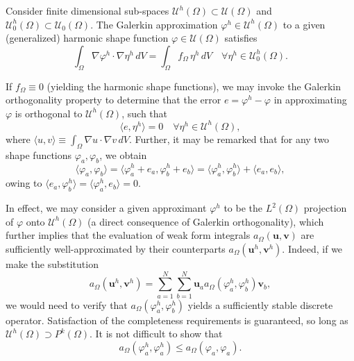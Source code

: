 	Consider finite dimensional sub-spaces $\mathcal{U}^h (\Omega) \subset \mathcal{U} (\Omega)$ and $\mathcal{U}^h_0 (\Omega) \subset \mathcal{U}_0 (\Omega)$. The Galerkin approximation $\varphi^h \in \mathcal{U}^h (\Omega)$ to a given (generalized) harmonic shape function $\varphi \in \mathcal{U} (\Omega)$ satisfies
	\begin{equation}
		\int_\Omega \nabla \varphi^h \cdot \nabla \eta^h \, dV = \int_\Omega f_{\Omega} \, \eta^h \, dV \quad \forall \eta^h \in \mathcal{U}^h_0 (\Omega).
		\label{eq:weak_poisson}
	\end{equation}

	If $f_\Omega \equiv 0$ (yielding the harmonic shape functions), we may invoke the Galerkin orthogonality property to determine that the error $e = \varphi^h - \varphi$ in approximating $\varphi$ is orthogonal to $\mathcal{U}^h (\Omega)$, such that
	\begin{equation}
		\langle e, \eta^h \rangle = 0 \quad \forall \eta^h \in \mathcal{U}^h (\Omega),
	\end{equation}
	where $\langle u, v \rangle \equiv \int_\Omega \nabla u \cdot \nabla v \, dV$. Further, it may be remarked that for any two shape functions $\varphi_a, \varphi_b$, we obtain
	\begin{equation}
		\langle \varphi_a, \varphi_b \rangle = \langle \varphi^h_a + e_a, \varphi^h_b + e_b \rangle = \langle \varphi^h_a, \varphi^h_b \rangle + \langle e_a, e_b \rangle,
	\end{equation}
	owing to $\langle e_a, \varphi^h_b \rangle = \langle \varphi^h_a, e_b \rangle = 0$.

	In effect, we may consider a given approximant $\varphi^h$ to be the $L^2(\Omega)$ projection of $\varphi$ onto $\mathcal{U}^h (\Omega)$ (a direct consequence of Galerkin orthogonality), which further implies that the evaluation of weak form integrals $a_\Omega (\mathbf{u}, \mathbf{v})$ are sufficiently well-approximated by their counterparts $a_\Omega (\mathbf{u}^h, \mathbf{v}^h)$. Indeed, if we make the substitution
	\begin{equation}
		a_\Omega (\mathbf{u}^h, \mathbf{v}^h) = \sum_{a=1}^N \sum_{b=1}^N  \mathbf{u}_a a_\Omega (  \varphi^h_a, \varphi^h_b ) \mathbf{v}_b,
	\end{equation}
	we would need to verify that $a_\Omega (  \varphi^h_a, \varphi^h_b )$ yields a sufficiently stable discrete operator. Satisfaction of the completeness requirements is guaranteed, so long as $\mathcal{U}^h (\Omega) \supset P^k(\Omega)$. It is not difficult to show that
	\begin{equation}
		a_\Omega (  \varphi^h_a, \varphi^h_a ) \leq a_\Omega (  \varphi_a, \varphi_a ).
	\end{equation}
	
